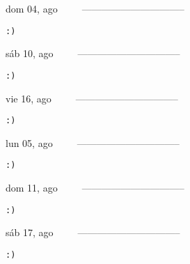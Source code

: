 \documentclass[letterpaper,10pt]{article}
\begin{document}
\begin{multicols}{3}
{dom 04, ago\ \ \ \ \ --------------------------------}
\begin{flushright}\begin{small}\texttt{:)}\end{small}\end{flushright}
\vfill
{sáb 10, ago\ \ \ \ \ --------------------------------}
\begin{flushright}\begin{small}\texttt{:)}\end{small}\end{flushright}\par
\vfill
{vie 16, ago\ \ \ \ \ --------------------------------}
\begin{flushright}\begin{small}\texttt{:)}\end{small}\end{flushright}\par
\vfill
\end{multicols}
\vspace{1.05cm}

\begin{multicols}{3}
{lun 05, ago\ \ \ \ \ --------------------------------}
\begin{flushright}\begin{small}\texttt{:)}\end{small}\end{flushright}
\vfill
{dom 11, ago\ \ \ \ \ --------------------------------}
\begin{flushright}\begin{small}\texttt{:)}\end{small}\end{flushright}\par
\vfill
{sáb 17, ago\ \ \ \ \ --------------------------------}
\begin{flushright}\begin{small}\texttt{:)}\end{small}\end{flushright}\par
\vfill
\end{multicols}
\vspace{1.05cm}
\end{document}
